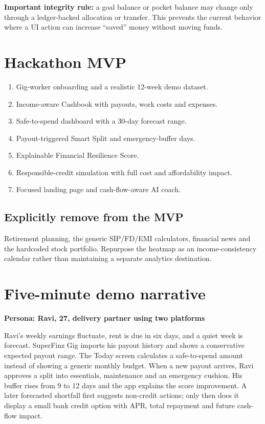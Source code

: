 \documentclass[10pt,a4paper]{article}
\begin{document}
\begin{accentbox}
\textbf{Important integrity rule:} a goal balance or pocket balance may change only through a ledger-backed allocation or transfer. This prevents the current behavior where a UI action can increase ``saved'' money without moving funds.
\end{accentbox}

\section{Hackathon MVP}

\begin{enumerate}
  \item Gig-worker onboarding and a realistic 12-week demo dataset.
  \item Income-aware Cashbook with payouts, work costs and expenses.
  \item Safe-to-spend dashboard with a 30-day forecast range.
  \item Payout-triggered Smart Split and emergency-buffer days.
  \item Explainable Financial Resilience Score.
  \item Responsible-credit simulation with full cost and affordability impact.
  \item Focused landing page and cash-flow-aware AI coach.
\end{enumerate}

\subsection{Explicitly remove from the MVP}

Retirement planning, the generic SIP/FD/EMI calculators, financial news and the hardcoded stock portfolio. Repurpose the heatmap as an income-consistency calendar rather than maintaining a separate analytics destination.

\newpage
\section{Five-minute demo narrative}

\begin{herobox}
\textbf{Persona: Ravi, 27, delivery partner using two platforms}\par
Ravi's weekly earnings fluctuate, rent is due in six days, and a quiet week is forecast. SuperFinz Gig imports his payout history and shows a conservative expected payout range. The Today screen calculates a safe-to-spend amount instead of showing a generic monthly budget. When a new payout arrives, Ravi approves a split into essentials, maintenance and an emergency cushion. His buffer rises from 9 to 12 days and the app explains the score improvement. A later forecasted shortfall first suggests non-credit actions; only then does it display a small bank credit option with APR, total repayment and future cash-flow impact.
\end{herobox}
\end{document}
